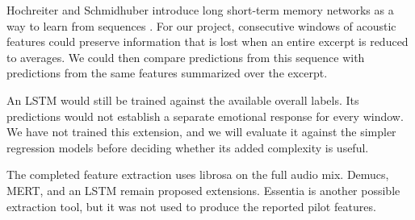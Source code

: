 Hochreiter and Schmidhuber introduce long short-term memory networks as a way to learn from sequences \cite{hochreiter1997lstm}. For our project, consecutive windows of acoustic features could preserve information that is lost when an entire excerpt is reduced to averages. We could then compare predictions from this sequence with predictions from the same features summarized over the excerpt.

An LSTM would still be trained against the available overall labels. Its predictions would not establish a separate emotional response for every window. We have not trained this extension, and we will evaluate it against the simpler regression models before deciding whether its added complexity is useful.

The completed feature extraction uses librosa on the full audio mix. Demucs, MERT, and an LSTM remain proposed extensions. Essentia is another possible extraction tool, but it was not used to produce the reported pilot features.

